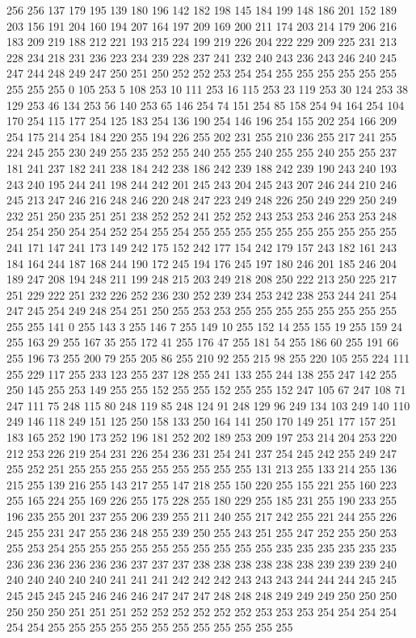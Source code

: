 256 256 137 179 195 139 180 196 142 182 198 145 184 199 148 186 201 152 189 203 156 191 204 160 194 207 164 197 209 169 200 211 174 203 214 179 206 216 183 209 219 188 212 221 193 215 224 199 219 226 204 222 229 209 225 231 213 228 234 218 231 236 223 234 239 228 237 241 232 240 243 236 243 246 240 245 247 244 248 249 247 250 251 250 252 252 253 254 254 255 255 255 255 255 255 255 255 255 0 105 253 5 108 253 10 111 253 16 115 253 23 119 253 30 124 253 38 129 253 46 134 253 56 140 253 65 146 254 74 151 254 85 158 254 94 164 254 104 170 254 115 177 254 125 183 254 136 190 254 146 196 254 155 202 254 166 209 254 175 214 254 184 220 255 194 226 255 202 231 255 210 236 255 217 241 255 224 245 255 230 249 255 235 252 255 240 255 255 240 255 255 240 255 255 237 181 241 237 182 241 238 184 242 238 186 242 239 188 242 239 190 243 240 193 243 240 195 244 241 198 244 242 201 245 243 204 245 243 207 246 244 210 246 245 213 247 246 216 248 246 220 248 247 223 249 248 226 250 249 229 250 249 232 251 250 235 251 251 
238 252 252 241 252 252 243 253 253 246 253 253 248 254 254 250 254 254 252 254 255 254 255 255 255 255 255 255 255 255 255 255 241 171 147 241 173 149 242 175 152 242 177 154 242 179 157 243 182 161 243 184 164 244 187 168 244 190 172 245 194 176 245 197 180 246 201 185 246 204 189 247 208 194 248 211 199 248 215 203 249 218 208 250 222 213 250 225 217 251 229 222 251 232 226 252 236 230 252 239 234 253 242 238 253 244 241 254 247 245 254 249 248 254 251 250 255 253 253 255 255 255 255 255 255 255 255 255 255 141 0 255 143 3 255 146 7 255 149 10 255 152 14 255 155 19 255 159 24 255 163 29 255 167 35 255 172 41 255 176 47 255 181 54 255 186 60 255 191 66 255 196 73 255 200 79 255 205 86 255 210 92 255 215 98 255 220 105 255 224 111 255 229 117 255 233 123 255 237 128 255 241 133 255 244 138 255 247 142 255 250 145 255 253 149 255 255 152 255 255 152 255 255 152 247 105 67 247 108 71 247 111 75 248 115 80 248 119 85 248 124 91 248 129 96 249 134 103 249 140 110 249 146 118 249 151 
125 250 158 133 250 164 141 250 170 149 251 177 157 251 183 165 252 190 173 252 196 181 252 202 189 253 209 197 253 214 204 253 220 212 253 226 219 254 231 226 254 236 231 254 241 237 254 245 242 255 249 247 255 252 251 255 255 255 255 255 255 255 255 255 131 213 255 133 214 255 136 215 255 139 216 255 143 217 255 147 218 255 150 220 255 155 221 255 160 223 255 165 224 255 169 226 255 175 228 255 180 229 255 185 231 255 190 233 255 196 235 255 201 237 255 206 239 255 211 240 255 217 242 255 221 244 255 226 245 255 231 247 255 236 248 255 239 250 255 243 251 255 247 252 255 250 253 255 253 254 255 255 255 255 255 255 255 255 255 255 235 235 235 235 235 235 236 236 236 236 236 236 237 237 237 238 238 238 238 238 238 239 239 239 240 240 240 240 240 240 241 241 241 242 242 242 243 243 243 244 244 244 245 245 245 245 245 245 246 246 246 247 247 247 248 248 248 249 249 249 250 250 250 250 250 250 251 251 251 252 252 252 252 252 252 253 253 253 254 254 254 254 254 254 255 255 255 255 255 255 255 255 255 255 255 255 
